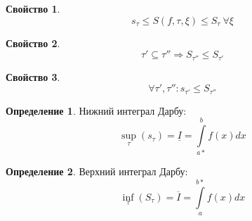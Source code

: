 \documentclass[a4paper]{article}
\theoremstyle{definition}
\newtheorem*{definition*}{Определение}
\newtheorem{property}{Свойство}
\numberwithin{theorem}{subsection}
\numberwithin{lemma}{subsection}
\numberwithin{definition}{subsection}
\numberwithin{comment*}{subsection}
\numberwithin{consequence}{subsection}
\numberwithin{property}{subsection}
\begin{document}
\begin{property}
 $$ s_\tau \leq S(f, \tau, \xi) \leq S_\tau \  \forall{\xi}$$
\end{property}
\begin{property}
 $$ \tau' \subseteq \tau'' \Rightarrow S_{\tau''} \leq S_{\tau'}$$
\end{property}
\begin{property}
 $$\forall{\tau', \tau''}: s_{\tau'} \leq S_{\tau''} $$
\end{property}
\begin{definition*}
 Нижний интеграл Дарбу:
 $$ \sup_{\tau} (s_\tau) = \underline{I} = \int\limits_{a*}^b f(x)dx$$
\end{definition*}
\begin{definition*}
 Верхний интеграл Дарбу:
 $$ \inf_{\tau} (S_\tau) = \overline{I} = \int\limits_{a}^{b*} f(x)dx$$
\end{definition*}
\end{document}
